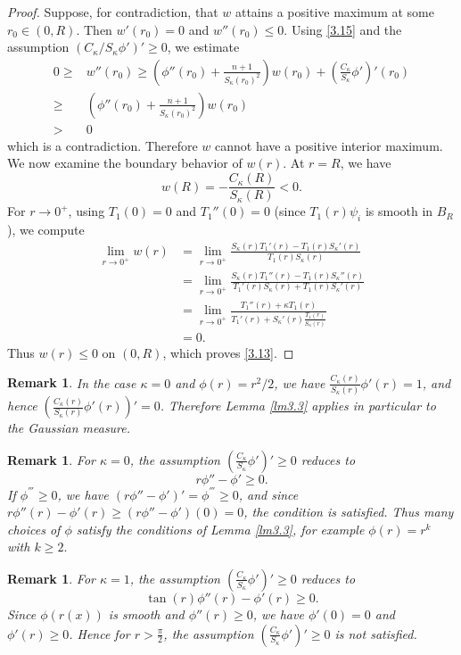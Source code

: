 \documentclass[11pt,leqno]{amsart}
\newtheorem{remark}[theorem]{Remark}
\def\k{\kappa}
\def\k{\kappa}
\numberwithin{equation}{section}
\begin{document}
\begin{proof}
Suppose, for contradiction, that  $w$ attains a positive maximum at some 
 $r_{0}\in (0,R)$. Then $w'(r_{0})=0$ and $w''(r_{0})\leq 0$. Using  \eqref{3.15} and the assumption $(C_\k/S_\k \phi')'\ge 0$, we estimate
\begin{align*}
     0 \geq& w''(r_{0})\geq (\phi''(r_{0})+\frac{n+1}{S_{\k}(r_{0})^{2}})w(r_{0})+\left(\frac{C_{\k}}{S_{\k}}\phi'\right)'(r_0)\\
     \ge & (\phi''(r_{0})+\frac{n+1}{S_{\k}(r_{0})^{2}})w(r_{0})\\
     >&0
\end{align*}
which is a contradiction. Therefore $w$ cannot have a positive interior maximum.
 We  now examine the boundary behavior of 
$w(r)$. At $r=R$, we have
 $$w(R)=-\frac{C_{\k}(R)}{S_{\k}(R)}<0.$$ 
 For $r\rightarrow 0^{+}$, using $T_1(0)=0$ and $T_1''(0)=0$ (since $T_1(r)\psi_i$ is smooth in $B_R$), we compute 
\begin{align*}
    \lim_{r\rightarrow 0^{+}}w(r)&=\lim_{r\rightarrow 0^{+}}\frac{S_{\k}(r)T_{1}'(r)-T_{1}(r)S_{\k}'(r)}{T_{1}(r)S_{\k}(r)}\\
    &=\lim_{r\rightarrow 0^{+}}\frac{S_{\k}(r)T_{1}''(r)-T_{1}(r)S_{\k}''(r)}{T_{1}'(r)S_{\k}(r)+T_{1}(r)S_{\k}'(r)}\\
    &=\lim_{r\rightarrow 0^{+}}\frac{T_{1}''(r)+\k T_{1}(r)}{T_{1}'(r)+S_{\k}'(r)\frac{T_{1}(r)}{S_{\k}(r)}}\\
    &=0.
\end{align*}
Thus $w(r)\leq 0$ on $(0,R)$, which proves \eqref{3.13}.
\end{proof}
\begin{remark}
    In the case $\k=0$ and $\phi(r)=r^{2}/2$, we have $\frac{C_{\k}(r)}{S_{\k}(r)}\phi'(r)=1$, and hence $(\frac{C_{\k}(r)}{S_{\k}(r)}\phi'(r))'=0$. Therefore Lemma  \ref{lm3.3}  applies in particular to the Gaussian measure.  
\end{remark}

\begin{remark}
    For $\k=0$, the assumption $(\frac{C_{\k}}{S_{\k}}\phi')'\geq 0$ reduces to $$r\phi''-\phi'\geq 0.$$
    If $\phi^{'''}\geq 0$, we have $(r\phi''-\phi')'=\phi^{'''}\geq 0$, and since $r\phi''(r)-\phi'(r)\geq (r\phi''-\phi')(0)=0$, the condition is satisfied.  Thus many choices of $\phi$
 satisfy the conditions of Lemma \ref{lm3.3},  for example 
$\phi(r)=r^{k}$ with $k\geq 2.$
\end{remark}

\begin{remark}
    For $\k=1$, the assumption $(\frac{C_{\k}}{S_{\k}}\phi')'\geq 0$ reduces to $$\tan (r)\phi''(r)-\phi'(r)\geq 0.$$ Since  $\phi(r(x))$ is smooth and $\phi''(r)\ge 0$, we have $\phi'(0)=0$ and $\phi'(r)\geq 0$. Hence for $r>\frac{\pi}{2}$, the assumption $(\frac{C_{\k}}{S_{\k}}\phi')'\geq 0$ is not satisfied.
\end{remark}
\end{document}
